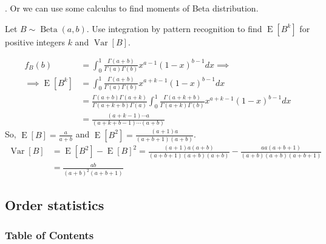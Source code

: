 \documentclass[8pt]{beamer}
\newcommand{\expec}[1]{\operatorname{E}\left[ #1 \right]}
\newcommand{\Var}[1]{\operatorname{Var}\left[#1\right]}
\newcommand{\Beta}[2]{\operatorname{Beta}\!\left(#1, #2\right)}
\begin{document}
\begin{frame}{.}
    Or we can use some calculus to find moments of Beta distribution.
    \begin{example}[Exercise 8.30]
        Let $B \sim \Beta{a}{b}$. Use integration by pattern recognition to find $\expec{B^k}$ for positive integers $k$ and $\Var{B}$.
    \end{example}

    \[
    \begin{aligned}
        f_B(b) &= \int_0^1 \frac{\Gamma(a+b)}{\Gamma(a) \Gamma(b)} x^{a-1} (1-x)^{b-1} dx \implies \\
        \implies \expec{B^k} &= \int_0^1 \frac{\Gamma(a+b)}{\Gamma(a) \Gamma(b)} x^{a+k-1} (1-x)^{b-1} dx \\
        &= \frac{\Gamma(a+b)\Gamma(a+k)}{\Gamma(a+k+b) \Gamma(a)}\int_0^1 \frac{\Gamma(a+k+b)}{\Gamma(a+k) \Gamma(b)} x^{a+k-1} (1-x)^{b-1}dx \\
        &= \frac{(a+k-1)\cdots a}{(a+k+b-1)\cdots (a+b)}
    \end{aligned}
    \]
    So, $\expec{B} = \frac{a}{a+b}$ and $\expec{B^2} = \frac{(a+1)a}{(a+b+1)(a+b)}$. 
    \[
    \begin{aligned}
        \Var{B} &= \expec{B^2} - \expec{B}^2 = \frac{(a+1)a(a+b)}{(a+b+1)(a+b)(a+b)}  - \frac{a a (a+b+1)}{(a+b)(a+b)(a+b+1)} \\
        &= \frac{ab}{(a+b)^2 (a+b+1)}
    \end{aligned}
    \]
\end{frame}


\subsection{Order statistics}
\begingroup
    \begin{frame}
        \frametitle{Table of Contents}
        \tableofcontents[currentsubsection]
    \end{frame}
\endgroup
\end{document}
